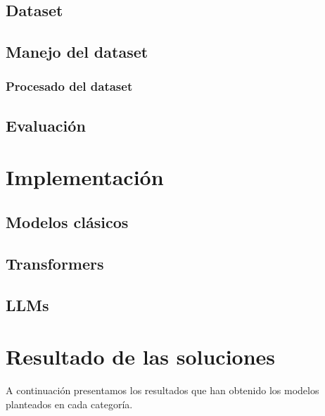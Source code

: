 \documentclass[11pt,spanish,listoffigures,listoftables]{tfgetsinf}
\begin{document}
\section{Dataset}

\section{Manejo del dataset}

\subsection{Procesado del dataset}

\section{Evaluación}

\chapter{Implementación}


\section{Modelos clásicos}

\section{Transformers}

\section{LLMs}


\chapter{Resultado de las soluciones}
A continuación presentamos los resultados que han obtenido los modelos planteados en cada categoría.
\end{document}
